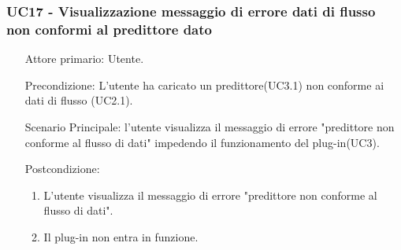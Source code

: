 \subsubsection{UC17 - Visualizzazione messaggio di errore dati di flusso non conformi al predittore dato}
\label{sssec:uc17}
\begin{description}
	\begin{enumerate}
		\item[Attore primario:] Utente.
		\item[Precondizione:] L'utente ha caricato un predittore(UC3.1) non conforme ai dati di flusso (UC2.1).	
		\item[Scenario Principale:] l'utente visualizza il messaggio di errore "predittore non conforme al flusso di dati" impedendo il funzionamento del plug-in(UC3).
		\item[Postcondizione:]
		\begin{enumerate}		
			\item L'utente visualizza il messaggio di errore "predittore non conforme al flusso di dati".
			\item Il plug-in non entra in funzione.
		\end{enumerate}	
	\end{enumerate}
\end{description}